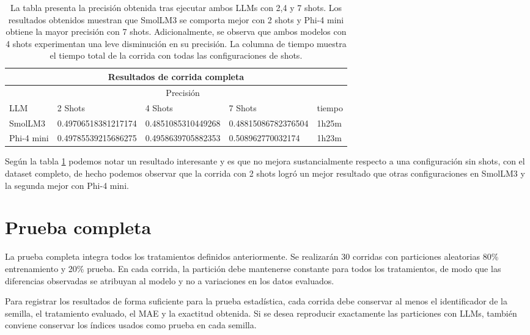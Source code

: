 \documentclass[12pt]{article}
\begin{document}
\begin{table}[H]
\centering
\begin{tabular}{lllll}
\multicolumn{5}{c}{Resultados de corrida completa}\\
\toprule
& \multicolumn{3}{c}{Precisión} & \\
LLM & 2 Shots & 4 Shots & 7 Shots & tiempo \\
\midrule
SmolLM3 & 0.49706518381217174 & 0.4851085310449268 & 0.48815086782376504 & 1h25m\\
Phi-4 mini & 0.49785539215686275 & 0.4958639705882353 & 0.508962770032174 & 1h23m\\
\bottomrule
\end{tabular}
\caption{La tabla presenta la precisión obtenida tras ejecutar ambos LLMs con 2,4 y 7 shots. Los resultados obtenidos muestran que SmolLM3 se comporta mejor con 2 shots y Phi-4 mini obtiene la mayor precisión con 7 shots. Adicionalmente, se observa que ambos modelos con 4 shots experimentan una leve disminución en su precisión. La columna de tiempo muestra el tiempo total de la corrida con todas las configuraciones de shots.}
\label{tab:with-shots}
\end{table}

Según la tabla \ref{tab:with-shots} podemos notar un resultado interesante y es que no mejora sustancialmente respecto a una configuración sin shots, con el dataset completo, de hecho podemos observar que la corrida con 2 shots logró un mejor resultado que otras configuraciones en SmolLM3 y la segunda mejor con Phi-4 mini.

\section{Prueba completa}

La prueba completa integra todos los tratamientos definidos anteriormente. Se realizarán 30 corridas con particiones aleatorias 80\% entrenamiento y 20\% prueba. En cada corrida, la partición debe mantenerse constante para todos los tratamientos, de modo que las diferencias observadas se atribuyan al modelo y no a variaciones en los datos evaluados.

Para registrar los resultados de forma suficiente para la prueba estadística, cada corrida debe conservar al menos el identificador de la semilla, el tratamiento evaluado, el MAE y la exactitud obtenida. Si se desea reproducir exactamente las particiones con LLMs, también conviene conservar los índices usados como prueba en cada semilla.
\end{document}
